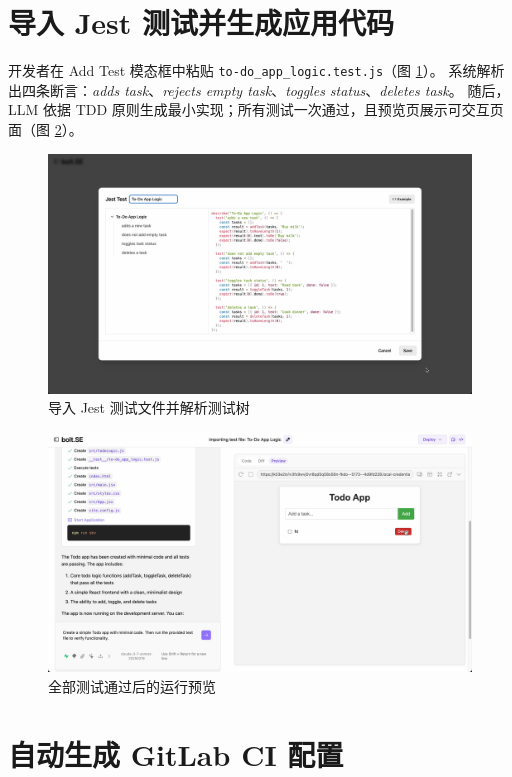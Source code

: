 \section{导入 Jest 测试并生成应用代码}

开发者在 Add Test 模态框中粘贴 \texttt{to-do\_app\_logic.test.js}（图 \ref{fig:jest_import}）。  
系统解析出四条断言：\textit{adds task}、\textit{rejects empty task}、\textit{toggles status}、\textit{deletes task}。  
随后，LLM 依据 TDD 原则生成最小实现；所有测试一次通过，且预览页展示可交互页面（图 \ref{fig:app_preview}）。

\begin{figure}[H]
  \centering
  \includegraphics[width=\textwidth]{figures/screenshots/ci-cd/jest_import.png}
  \caption{导入 Jest 测试文件并解析测试树}
  \label{fig:jest_import}
\end{figure}

\begin{figure}[H]
  \centering
  \includegraphics[width=.8\textwidth]{figures/screenshots/ci-cd/app_preview.png}
  \caption{全部测试通过后的运行预览}
  \label{fig:app_preview}
\end{figure}

\section{自动生成 GitLab CI 配置}
\label{sec:cicd-ci-yml}

